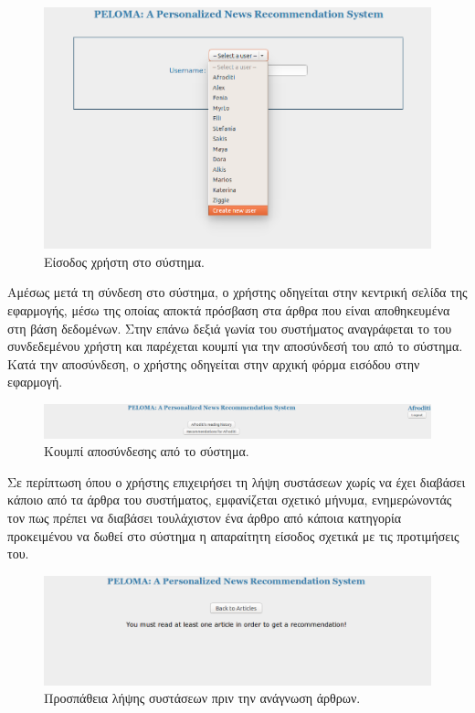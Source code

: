 \begin{figure}[!ht] \centering
\centerline{
    \includegraphics[scale=0.47]{static/figures/peloma/login2.png}}
    \caption{Είσοδος χρήστη στο σύστημα.}
    \label{}
\end{figure} 

Αμέσως μετά τη σύνδεση στο σύστημα, ο χρήστης οδηγείται στην κεντρική σελίδα της εφαρμογής, 
μέσω της οποίας αποκτά πρόσβαση στα άρθρα που είναι αποθηκευμένα στη βάση δεδομένων. 
Στην επάνω δεξιά γωνία του συστήματος αναγράφεται το {} του συνδεδεμένου χρήστη και 
παρέχεται κουμπί για την αποσύνδεσή του από το σύστημα. 
Κατά την αποσύνδεση, ο χρήστης οδηγείται στην αρχική φόρμα εισόδου στην εφαρμογή. \\

\begin{figure}[!ht] \centering
\centerline{
    \includegraphics[scale=0.35]{static/figures/peloma/logout.png}}
    \caption{Κουμπί αποσύνδεσης από το σύστημα.}
    \label{}
\end{figure} 

Σε περίπτωση όπου ο χρήστης επιχειρήσει τη λήψη συστάσεων χωρίς να έχει διαβάσει κάποιο από τα άρθρα του συστήματος, 
εμφανίζεται σχετικό μήνυμα, ενημερώνοντάς τον πως πρέπει να διαβάσει τουλάχιστον ένα άρθρο από κάποια κατηγορία 
προκειμένου να δωθεί στο σύστημα η απαραίτητη είσοδος σχετικά με τις προτιμήσεις του. \\

\begin{figure}[!ht] \centering
\centerline{
    \includegraphics[scale=0.5]{static/figures/peloma/not.png}}
    \caption{Προσπάθεια λήψης συστάσεων πριν την ανάγνωση άρθρων.}
    \label{}
\end{figure} 

